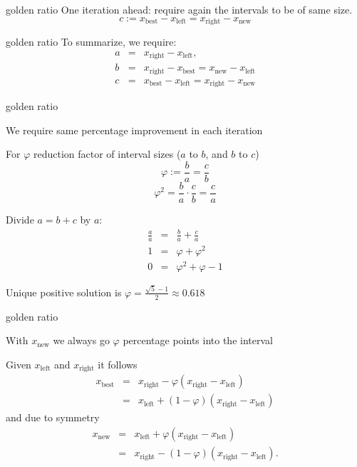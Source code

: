 \documentclass[11pt,compress,t,notes=noshow, xcolor=table]{beamer}
\newcommand{\xleft}{x_{\text{left}}} %
\newcommand{\xright}{x_{\text{right}}} %
\newcommand{\xnew}{x_{\text{new}}} %
\newcommand{\xbest}{x_{\text{best}}} %
\begin{document}
\begin{frame2}{golden ratio}
One iteration ahead: require again the intervals to be of same size. 
$$c := \xbest - \xleft = \xright - \xnew$$
\vfill
{}
\end{frame2}

\begin{frame2}{golden ratio}
To summarize, we require: 
\begin{eqnarray*}
a &=& \xright-\xleft, \\
b &=& \xright - \xbest = \xnew - \xleft \\
c &=& \xbest - \xleft = \xright - \xnew
\end{eqnarray*}
\vfill
{}
\end{frame2}

\begin{framei}{golden ratio}
\item We require same percentage improvement in each iteration
\item For $\varphi$ reduction factor of interval sizes ($a$ to $b$, and $b$ to $c$)
$$\varphi := \frac{b}{a} = \frac{c}{b}$$
$$\varphi^2 = \frac{b}{a} \cdot \frac{c}{b} = \frac{c}{a}$$
\item Divide $a = b + c$ by $a$:
\begin{eqnarray*}
\frac{a}{a} &=& \frac{b}{a} + \frac{c}{a} \\
1 &=& \varphi + \varphi^2 \\
0 &=& \varphi^2 + \varphi - 1
\end{eqnarray*}
\item Unique positive solution is $\varphi = \frac{\sqrt{5}-1}{2} \approx 0.618$
\end{framei}

\begin{framei}[fs=normalsize,sep=L]{golden ratio}
\item With $\xnew$ we always go $\varphi$ percentage points into the interval
\item Given $\xleft$ and $\xright$ it follows
\begin{eqnarray*}
\xbest&=&\xright-\varphi(\xright-\xleft)\\
&=&\xleft+(1-\varphi)(\xright-\xleft)
\end{eqnarray*}
and due to symmetry
\begin{eqnarray*}
\xnew&=& \xleft+\varphi(\xright-\xleft)\\ &=& \xright-(1-\varphi)(\xright-\xleft).
\end{eqnarray*}
\end{framei}
\end{document}
